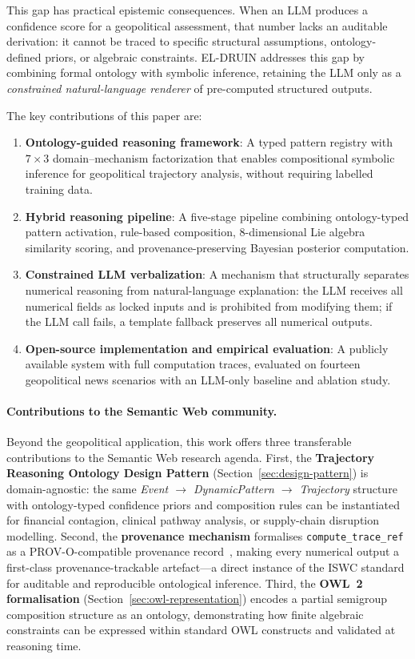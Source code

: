 \documentclass{llncs}
\begin{document}
This gap has practical epistemic consequences. When an LLM produces a
confidence score for a geopolitical assessment, that number lacks an
auditable derivation: it cannot be traced to specific structural assumptions,
ontology-defined priors, or algebraic constraints. EL-DRUIN addresses this
gap by combining formal ontology with symbolic inference, retaining the LLM
only as a \emph{constrained natural-language renderer} of pre-computed
structured outputs.

The key contributions of this paper are:
\begin{enumerate}
  \item \textbf{Ontology-guided reasoning framework}: A typed pattern registry with
    $7 \times 3$ domain--mechanism factorization that enables compositional
    symbolic inference for geopolitical trajectory analysis, without requiring
    labelled training data.
  \item \textbf{Hybrid reasoning pipeline}: A five-stage pipeline combining
    ontology-typed pattern activation, rule-based composition, 8-dimensional Lie
    algebra similarity scoring, and provenance-preserving Bayesian posterior
    computation.
  \item \textbf{Constrained LLM verbalization}: A mechanism that structurally
    separates numerical reasoning from natural-language explanation: the LLM
    receives all numerical fields as locked inputs and is prohibited from modifying
    them; if the LLM call fails, a template fallback preserves all numerical outputs.
  \item \textbf{Open-source implementation and empirical evaluation}: A publicly
    available system with full computation traces, evaluated on fourteen geopolitical
    news scenarios with an LLM-only baseline and ablation study.
\end{enumerate}

\paragraph{Contributions to the Semantic Web community.}
Beyond the geopolitical application, this work offers three transferable contributions
to the Semantic Web research agenda.
First, the \textbf{Trajectory Reasoning Ontology Design Pattern} (Section~\ref{sec:design-pattern})
is domain-agnostic: the same \emph{Event $\to$ DynamicPattern $\to$ Trajectory} structure
with ontology-typed confidence priors and composition rules can be instantiated for
financial contagion, clinical pathway analysis, or supply-chain disruption modelling.
Second, the \textbf{provenance mechanism} formalises \texttt{compute\_trace\_ref} as a
PROV-O-compatible provenance record~\cite{w3c2013provo}, making every numerical output
a first-class provenance-trackable artefact---a direct instance of the ISWC standard
for auditable and reproducible ontological inference.
Third, the \textbf{OWL~2 formalisation} (Section~\ref{sec:owl-representation}) encodes a
partial semigroup composition structure as an ontology, demonstrating how finite algebraic
constraints can be expressed within standard OWL constructs and validated at reasoning time.
\end{document}
